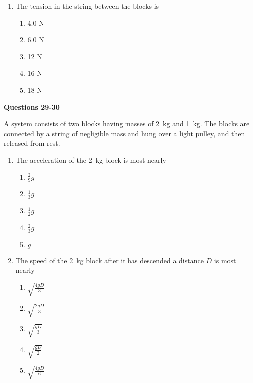 \documentclass{../../oss-apphys}
\begin{document}
\begin{multicols}{2}
\begin{enumerate}[resume,leftmargin=18pt]
  \item The tension in the string between the blocks is
    \begin{enumerate}[noitemsep,topsep=0pt,leftmargin=18pt,label=(\Alph*)]
    \item 4.0 N
    \item 6.0 N
    \item 12 N
    \item 16 N
    \item 18 N
    \end{enumerate}
  \end{enumerate}
  \columnbreak
  
  \textbf{Questions 29-30}

  A system consists of two blocks having masses of \SI{2}{\kilo\gram} and
  \SI{1}{\kilo\gram}. The blocks are connected by a string of negligible mass
  and hung over a light pulley, and then released from rest.
  \begin{center}
  \end{center}
  \begin{enumerate}[resume,leftmargin=18pt]
  \item The acceleration of the \SI{2}{\kilo\gram} block is most nearly
    \begin{enumerate}[noitemsep,topsep=0pt,leftmargin=18pt,label=(\Alph*)]
    \item $\displaystyle\frac{2}{9}g$
    \item $\displaystyle\frac{1}{3}g$
    \item $\displaystyle\frac{1}{2}g$
    \item $\displaystyle\frac{2}{3}g$
    \item $g$
    \end{enumerate}
  \item The speed of the \SI{2}{\kilo\gram} block after it has descended a
    distance $D$ is most nearly
    \begin{enumerate}[noitemsep,topsep=0pt,leftmargin=18pt,label=(\Alph*)]
    \item $\displaystyle\sqrt{\frac{4gD}{3}}$
    \item $\displaystyle\sqrt{\frac{2gD}{3}}$
    \item $\displaystyle\sqrt{\frac{gD}{3}}$
    \item $\displaystyle\sqrt{\frac{gD}{2}}$
    \item $\displaystyle\sqrt{\frac{4gD}{6}}$
    \end{enumerate}
  \end{enumerate}
  \columnbreak
  

\end{multicols}
\end{document}
